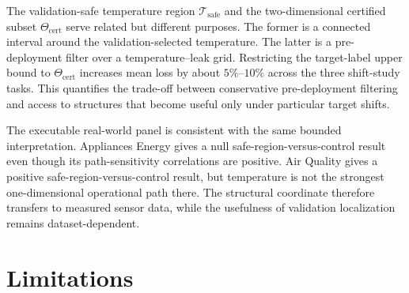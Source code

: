 \documentclass[preprint,12pt,authoryear]{elsarticle}
\begin{document}
The validation-safe temperature region $\mathcal T_{\mathrm{safe}}$ and the two-dimensional certified subset $\Theta_{\mathrm{cert}}$ serve related but different purposes. The former is a connected interval around the validation-selected temperature. The latter is a pre-deployment filter over a temperature--leak grid. Restricting the target-label upper bound to $\Theta_{\mathrm{cert}}$ increases mean loss by about $5\%$--$10\%$ across the three shift-study tasks. This quantifies the trade-off between conservative pre-deployment filtering and access to structures that become useful only under particular target shifts.

The executable real-world panel is consistent with the same bounded interpretation. Appliances Energy gives a null safe-region-versus-control result even though its path-sensitivity correlations are positive. Air Quality gives a positive safe-region-versus-control result, but temperature is not the strongest one-dimensional operational path there. The structural coordinate therefore transfers to measured sensor data, while the usefulness of validation localization remains dataset-dependent.

\section{Limitations}
\label{sec:limitations}
\end{document}
